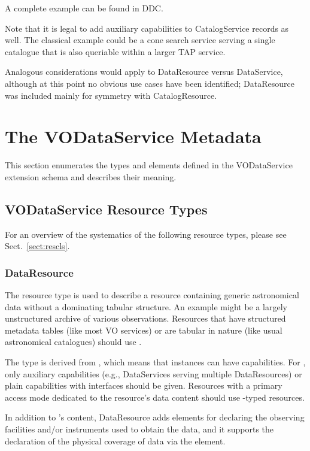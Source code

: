\documentclass[11pt,a4paper]{ivoa}
\begin{document}
A complete example can be found in DDC.

Note that it is legal to add auxiliary capabilities to CatalogService
records as well.  The classical example could be a cone search service
serving a single catalogue that is also queriable within a larger TAP
service.

Analogous considerations would apply to DataResource versus DataService,
although at this point no obvious use cases have been identified;
DataResource was included mainly for symmetry with CatalogResource.

\section{The VODataService Metadata}
\label{sect:metadata}


This section enumerates the types and elements defined in the
VODataService extension schema and describes their meaning.


\subsection{VODataService Resource Types}
\label{sect:resext}

For an overview of the systematics of the following resource types,
please see Sect.~\ref{sect:rescls}.

\subsubsection{DataResource}
\label{sect:DataResource}

The  resource type is used to describe a
resource containing generic astronomical data without a dominating
tabular structure.  An example might be a largely unstructured archive
of various observations.  Resources that have structured metadata tables
(like most VO services) or are tabular in nature (like usual
astronomical catalogues) should use .

The type is derived from , which means that instances
can have
capabilities.  For , only auxiliary capabilities
(e.g., DataServices serving multiple DataResources) or plain capabilities
with  interfaces should be given.  Resources with a
primary access mode dedicated to the resource's data content should use
-typed resources.

In addition to 's content, DataResource adds
elements for declaring the observing facilities and/or instruments used
to obtain the data, and it supports the declaration of
the physical coverage of data via the 
element.
\end{document}
